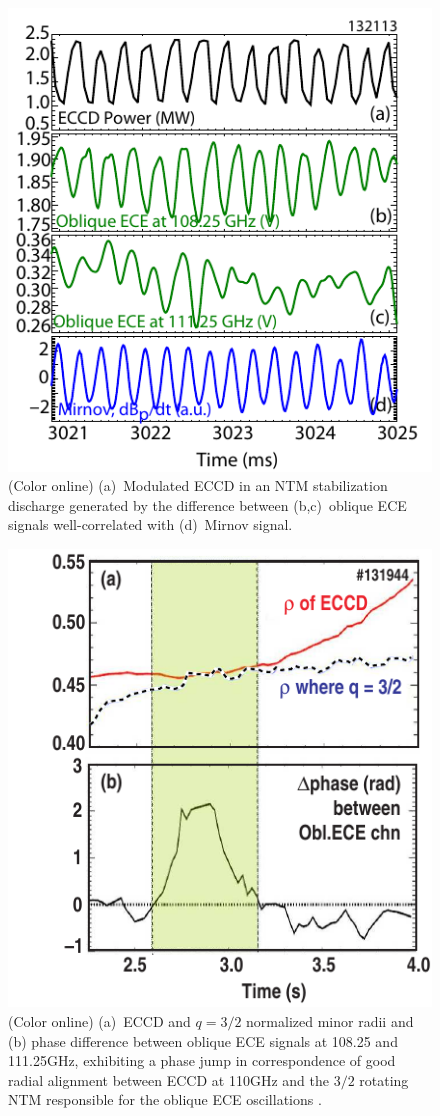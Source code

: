 \documentclass[aps,pra,twocolumn]{revtex4}
\begin{document}
\begin{figure}[t]
  \includegraphics[scale=1.]{fig7.pdf} %
  \caption{\label{Fig132113det} (Color online) 
  (a)~Modulated ECCD in an NTM stabilization discharge \cite{PoP} 
generated by the difference between (b,c)~oblique ECE signals well-correlated
with (d)~Mirnov signal.}
\end{figure}

\begin{figure}[t]
  \includegraphics[scale=1.0]{fig8.pdf} %
  \caption{\label{FigAlign1}(Color online)
 (a)~ECCD and $q=3/2$ normalized minor radii and (b) phase difference between
 oblique ECE signals at 108.25 and 111.25GHz, exhibiting a phase jump in 
 correspondence of good radial alignment between ECCD at 110GHz and the 
 $3/2$ rotating NTM responsible for the oblique ECE oscillations \cite{PoP}.}
\end{figure}
\end{document}
